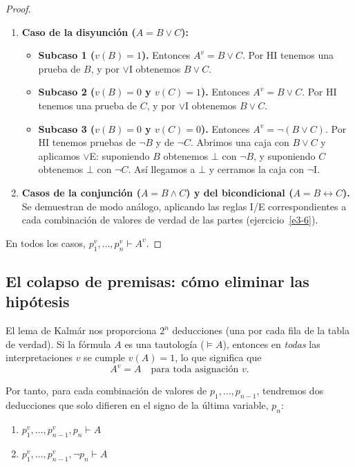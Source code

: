 \begin{proof}
\begin{enumerate}
    \item \textbf{Caso de la disyunción ($A = B \lor C$):}
    \begin{itemize}
        \item \textbf{Subcaso 1 ($v(B) = 1$).} Entonces $A^v = B \lor C$. Por HI tenemos una prueba de $B$, y por $\lor$I obtenemos $B \lor C$.
        \item \textbf{Subcaso 2 ($v(B) = 0$ y $v(C) = 1$).} Entonces $A^v = B \lor C$. Por HI tenemos una prueba de $C$, y por $\lor$I obtenemos $B \lor C$.
        \item \textbf{Subcaso 3 ($v(B) = 0$ y $v(C) = 0$).} Entonces $A^v = \neg(B \lor C)$. Por HI tenemos pruebas de $\neg B$ y de $\neg C$. Abrimos una caja con $B \lor C$ y aplicamos $\lor$E: suponiendo $B$ obtenemos $\bot$ con $\neg B$, y suponiendo $C$ obtenemos $\bot$ con $\neg C$. Así llegamos a $\bot$ y cerramos la caja con $\neg$I.
    \end{itemize}

    \item \textbf{Casos de la conjunción ($A = B \land C$) y del bicondicional ($A = B \leftrightarrow C$).}  
    Se demuestran de modo análogo, aplicando las reglas I/E correspondientes a cada combinación de valores de verdad de las partes (ejercicio~\ref{e3-6}).
\end{enumerate}
En todos los casos, $p_1^v, \dots, p_n^v \vdash A^v$.
\end{proof}

\subsection{El colapso de premisas: cómo eliminar las hipótesis}

El lema de Kalmár nos proporciona $2^n$ deducciones (una por cada fila de la tabla de verdad). Si la fórmula $A$ es una tautología ($\models A$), entonces en \emph{todas} las interpretaciones $v$ se cumple $v(A) = 1$, lo que significa que
\[
A^v = A \quad \text{para toda asignación } v.
\]

Por tanto, para cada combinación de valores de $p_1, \dots, p_{n-1}$, tendremos dos deducciones que solo difieren en el signo de la última variable, $p_n$:
\begin{enumerate}
    \item $p_1^v, \dots, p_{n-1}^v, p_n \vdash A$
    \item $p_1^v, \dots, p_{n-1}^v, \neg p_n \vdash A$
\end{enumerate}

